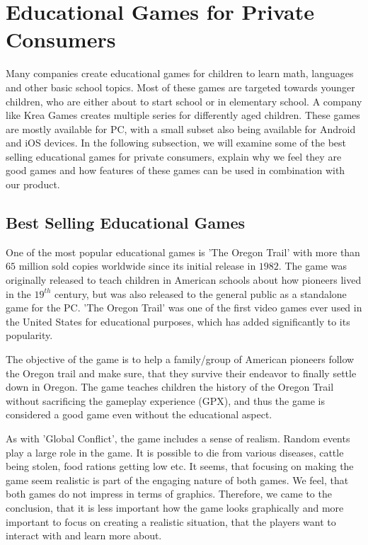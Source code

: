 \section{Educational Games for Private Consumers}
\label{sec:privateconsumers}
Many companies create educational games for children to learn math, languages and other basic school topics.
Most of these games are targeted towards younger children, who are either about to start school or in elementary school.
A company like Krea Games creates multiple series for differently aged children.\cite{kreagames}
These games are mostly available for PC, with a small subset also being available for Android and iOS devices.
In the following subsection, we will examine some of the best selling educational games for private consumers, explain why we feel they are good games and how features of these games can be used in combination with our product.

\subsection{Best Selling Educational Games}
One of the most popular educational games is 'The Oregon Trail' with more than $65$ million sold copies worldwide since its initial release in $1982$.\cite{oregontrail}
The game was originally released to teach children in American schools about how pioneers lived in the $19^{th}$ century, but was also released to the general public as a standalone game for the PC. 'The Oregon Trail' was one of the first video games ever used in the United States for educational purposes, which has added significantly to its popularity.

The objective of the game is to help a family/group of American pioneers follow the Oregon trail and make sure, that they survive their endeavor to finally settle down in Oregon. The game teaches children the history of the Oregon Trail without sacrificing the gameplay experience (GPX), and thus the game is considered a good game even without the educational aspect.\newline

As with 'Global Conflict', the game includes a sense of realism.
Random events play a large role in the game.
It is possible to die from various diseases, cattle being stolen, food rations getting low etc.
It seems, that focusing on making the game seem realistic is part of the engaging nature of both games.
We feel, that both games do not impress in terms of graphics.
Therefore, we came to the conclusion, that it is less important how the game looks graphically and more important to focus on creating a realistic situation, that the players want to interact with and learn more about.\newline

